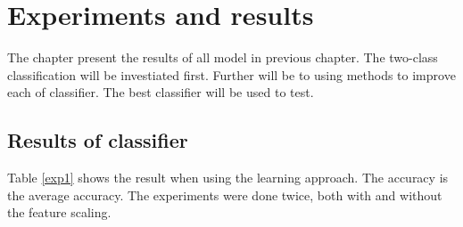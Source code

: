 \documentclass[USenglish]{ifimaster}  %
\begin{document}
\chapter{Experiments and results}                     %
The chapter present the results of all model in previous chapter. The two-class classification will be investiated first. Further will be to using methods to improve each of classifier. The best classifier will be used to test. 

\section{Results of classifier}\label{result_exp1}
Table \ref{exp1} shows the result when using the learning approach. The accuracy is the average accuracy. The experiments were done twice, both with and without the feature scaling. 
\end{document}

